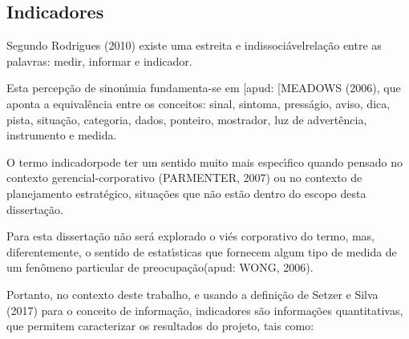 \documentclass[
12pt,		%
openright,	%
twoside,  %
a4paper,			%
chapter=TITLE,		%
english,			%
french,				%
spanish,			%
brazil				%
]{USPSC-classe/USPSC}
\begin{document}
\subsection[Indicadores]{Indicadores}\label{Indicadores}
Segundo  Rodrigues (2010)  existe uma \textquotedbl estreita e indissoci\'avel\textquotedbl  rela\c{c}\~ao entre as palavras: medir, informar e \textquotedbl indicador\textquotedbl .










Esta percep\c{c}\~ao de sinon\'{\i}mia fundamenta-se em [apud: [MEADOWS (2006), que aponta a equival\^encia entre os conceitos: sinal, sintoma, press\'agio, aviso, dica, pista, situa\c{c}\~ao, categoria, dados, ponteiro, mostrador, luz de advert\^encia, instrumento e medida.










O termo \textquotedbl indicador\textquotedbl  pode ter um sentido muito mais espec\'{\i}fico quando pensado no contexto gerencial-corporativo (PARMENTER, 2007) ou no contexto de planejamento estrat\'egico, situa\c{c}\~oes que n\~ao est\~ao dentro do escopo desta disserta\c{c}\~ao.










Para esta disserta\c{c}\~ao n\~ao ser\'a explorado o vi\'es corporativo do termo, mas, diferentemente, o sentido de \textquotedbl estat\'{\i}sticas que fornecem algum tipo de medida de um fen\^omeno particular de preocupa\c{c}\~ao\textquotedbl  (apud: WONG, 2006).










Portanto, no contexto deste trabalho, e usando a defini\c{c}\~ao de  Setzer e Silva (2017) para o conceito de \textquotedbl informa\c{c}\~ao\textquotedbl , indicadores s\~ao informa\c{c}\~oes quantitativas, que permitem caracterizar os resultados do projeto, tais como:
\end{document}
